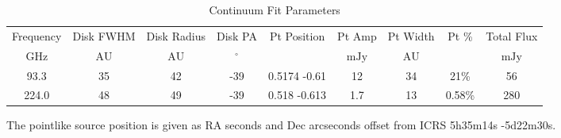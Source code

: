 \begin{table*}[htp]
\centering
\caption{Continuum Fit Parameters}
\begin{tabular}{ccccccccc}
\label{tab:continuum_fit_parameters}
Frequency & Disk FWHM & Disk Radius & Disk PA & Pt Position & Pt Amp & Pt Width & Pt \% & Total Flux \\
$\mathrm{GHz}$ & $\mathrm{AU}$ & $\mathrm{AU}$ & $\mathrm{{}^{\circ}}$ &  & $\mathrm{mJy}$ & $\mathrm{AU}$ & $\mathrm{}$ & $\mathrm{mJy}$ \\
\hline
93.3 & 35 & 42 & -39 & 0.5174 -0.61 & 12 & 34 & 21\% & 56 \\
224.0 & 48 & 49 & -39 & 0.518 -0.613 & 1.7 & 13 & 0.58\% & 280 \\
\hline
\end{tabular}

\par The pointlike source position is given as RA seconds and Dec arcseconds offset from ICRS 5h35m14s -5d22m30s.
\end{table*}
